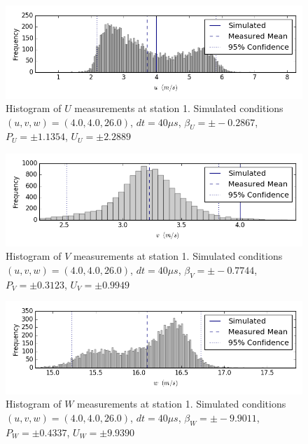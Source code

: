 \begin{figure}[H]
\centering
\includegraphics[width=6in]{figs/Ely_May28th01002/uncertainty_Ely_May28th01002_U}
\caption{Histogram of $U$ measurements at station 1. Simulated conditions $(u,v,w)=(4.0, 4.0, 26.0)$, $dt=40 \mu s$, $\beta_U=\pm -0.2867$, $P_U=\pm 1.1354$, $U_U=\pm 2.2889$}
\label{fig:uncertainty_Ely_May28th01002_U}
\end{figure}


\begin{figure}[H]
\centering
\includegraphics[width=6in]{figs/Ely_May28th01002/uncertainty_Ely_May28th01002_V}
\caption{Histogram of $V$ measurements at station 1. Simulated conditions $(u,v,w)=(4.0, 4.0, 26.0)$, $dt=40 \mu s$, $\beta_V=\pm -0.7744$, $P_V=\pm 0.3123$, $U_V=\pm 0.9949$}
\label{fig:uncertainty_Ely_May28th01002_V}
\end{figure}


\begin{figure}[H]
\centering
\includegraphics[width=6in]{figs/Ely_May28th01002/uncertainty_Ely_May28th01002_W}
\caption{Histogram of $W$ measurements at station 1. Simulated conditions $(u,v,w)=(4.0, 4.0, 26.0)$, $dt=40 \mu s$, $\beta_W=\pm -9.9011$, $P_W=\pm 0.4337$, $U_W=\pm 9.9390$}
\label{fig:uncertainty_Ely_May28th01002_W}
\end{figure}


